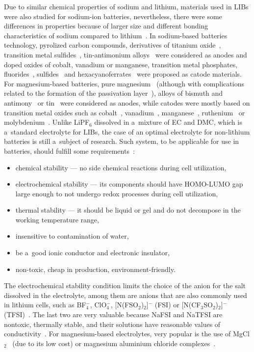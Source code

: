 Due to similar chemical properties of sodium and lithium, materials used in LIBs were also studied for sodium-ion batteries, nevertheless, there were some differences in properties because of larger size and different bonding characteristics of sodium compared to lithium~\cite{li-na-comparison}. In sodium-based batteries technology, pyrolized carbon compounds, derivatives of titanium oxide~\cite{na-ion-1}, transition metal sulfides~\cite{na-ion-5}, tin-antimonium alloys~\cite{na-ion-2} were considered as anodes and doped oxides of cobalt, vanadium or manganese, transition metal phosphates, fluorides~\cite{na-ion-1}, sulfides~\cite{na-ion-2} and hexacyanoferrates~\cite{na-ion-5} were proposed as catode materials. For magnesium-based batteries, pure magnesium~\cite{mg-ion-1} (although with complications related to the formation of the passivation layer~\cite{mg-ion-10}), alloys of bismuth and antimony~\cite{mg-ion-11} or tin~\cite{mg-ion-12} were considered as anodes, while catodes were mostly based on transition metal oxides such as cobalt~\cite{mg-ion-14}, vanadium~\cite{mg-ion-15}, manganese~\cite{mg-ion-17}, ruthenium~\cite{mg-ion-13} or molybdenium~\cite{mg-ion-16}. Unlike LiPF$_6$ dissolved in a~mixture of EC and DMC, which is a~standard electrolyte for LIBs, the case of an optimal electrolyte for non-lithium batteries is still a~subject of research. Such system, to be applicable for use in batteries, should fulfill some requirements~\cite{na-ion-4}:
\begin{itemize}
    \item chemical stability --- no side chemical reactions during cell utilization,
    \item electrochemical stability --- its components should have HOMO-LUMO gap large enough to not undergo redox processes during cell utilization,
    \item thermal stability --- it should be liquid or gel and do not decompose in the working temperature range,
    \item insensitive to contamination of water,
    \item be a~good ionic conductor and electronic insulator,
    \item non-toxic, cheap in production, environment-friendly.
\end{itemize}

The electrochemical stability condition limits the choice of the anion for the salt dissolved in the electrolyte, among them are anions that are also commonly used in lithium cells, such as BF$_4^{-}$, ClO$_4^{-}$, [N(FSO$_2$)$_2$]$^{-}$ (FSI) or [N(CF$_3$SO$_2$)$_2$]$^{-}$ (TFSI)~\cite{na-ion-4}. The last two are very valuable because NaFSI and NaTFSI are nontoxic, thermally stable, and their solutions have reasonable values of conductivity~\cite{na-fsi,na-il-1}. For magnesium-based electrolytes, very popular is the use of MgCl$_2$~\cite{mg-ion-7} (due to its low cost) or magnesium aluminium chloride complexes~\cite{mg-ion-6}.


